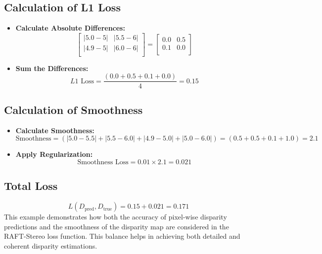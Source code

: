 \documentclass[22pt]{report}
\begin{document}
\subsection*{Calculation of L1 Loss}
\begin{itemize}
    \item \textbf{Calculate Absolute Differences:}
            \[
            \begin{bmatrix}
            |5.0 - 5| & |5.5 - 6| \\
            |4.9 - 5| & |6.0 - 6| \\
            \end{bmatrix}
            =
            \begin{bmatrix}
            0.0 & 0.5 \\
            0.1 & 0.0 \\
            \end{bmatrix}
            \]

    \item \textbf{Sum the Differences:}
            \[
            L1 \text{ Loss} = \frac{(0.0 + 0.5 + 0.1 + 0.0)}{4} = 0.15
            \]
\end{itemize}
\vspace{12}
\subsection*{Calculation of Smoothness}
\begin{itemize}
    \item \textbf{Calculate Smoothness:}
            \[
            \text{Smoothness} = (|5.0 - 5.5| + |5.5 - 6.0| + |4.9 - 5.0| + |5.0 - 6.0|) = (0.5 + 0.5 + 0.1 + 1.0) = 2.1
            \]
    \item \textbf{Apply Regularization:}
            \[
            \text{Smoothness Loss} = 0.01 \times 2.1 = 0.021
            \]
\end{itemize}
\vspace{8}
\subsection*{Total Loss}
    \[
    L(D_{\text{pred}}, D_{\text{true}}) = 0.15 + 0.021 = 0.171
    \]
\vspace{8}
This example demonstrates how both the accuracy of pixel-wise disparity predictions and the smoothness of the disparity map are considered in the RAFT-Stereo loss function. This balance helps in achieving both detailed and coherent disparity estimations.
\end{document}
